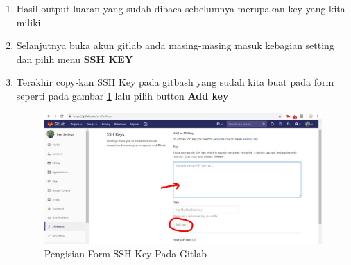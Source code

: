 \begin{enumerate}
\item Hasil output luaran yang sudah dibaca sebelumnya merupakan key yang kita miliki
\item Selanjutnya buka akun gitlab anda masing-masing masuk kebagian setting dan pilih menu \textbf{SSH KEY}
\item Terakhir copy-kan SSH Key pada gitbash yang sudah kita buat pada form seperti pada gambar \ref{fig:k2} lalu pilih button \textbf{Add key}
\subitem
\begin{figure}[!htbp]
\centerline{\includegraphics[width=.75\textwidth]{Figures/gitlab/SettingSSH.JPG}}
\caption{Pengisian Form SSH Key Pada Gitlab}
\label{fig:k2}
\end{figure}
\end{enumerate}


